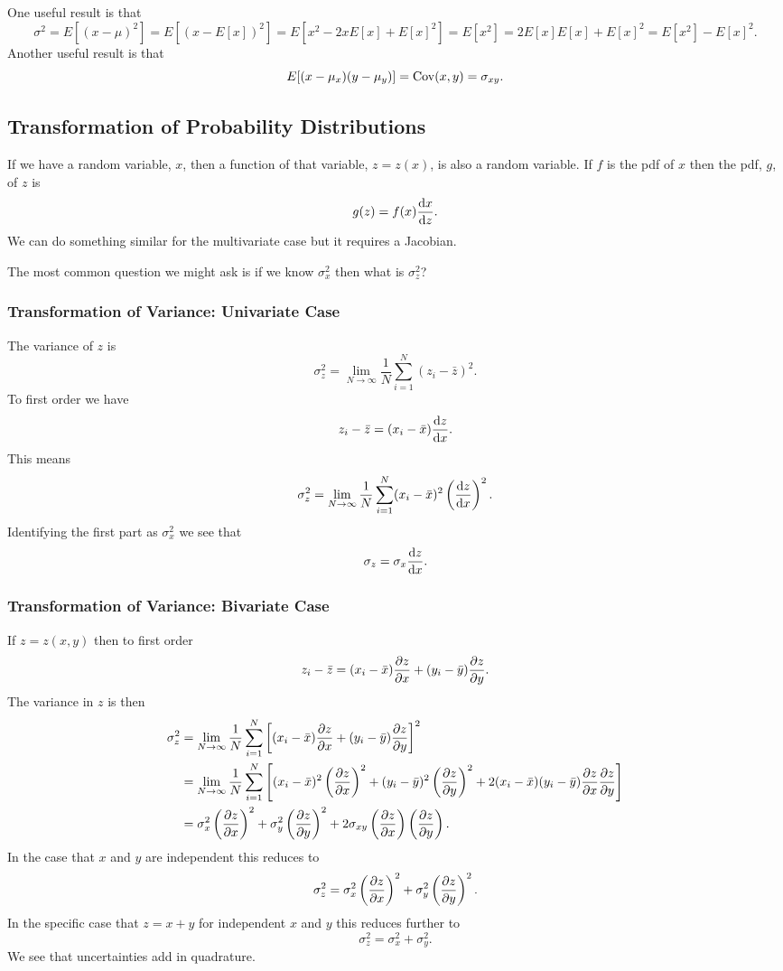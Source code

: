     One useful result is that
    \[\sigma^2 = E[(x - \mu)^2] = E[(x - E[x])^2] = E[x^2 - 2xE[x] + E[x]^2] = E[x^2] = 2E[x]E[x] + E[x]^2 = E[x^2] - E[x]^2.\]
    Another useful result is that
    \[E[(x - \mu_x)(y - \mu_y)] = \operatorname{Cov}(x, y) = \sigma_{xy}.\]
    
    \subsection{Transformation of Probability Distributions}
    If we have a random variable, \(x\), then a function of that variable, \(z = z(x)\), is also a random variable.
    If \(f\) is the \acrshort{pdf} of \(x\) then the \acrshort{pdf}, \(g\), of \(z\) is
    \[g(z) = f(x)\dv{x}{z}.\]
    We can do something similar for the multivariate case but it requires a Jacobian.
    
    The most common question we might ask is if we know \(\sigma_x^2\) then what is \(\sigma_z^2\)?
    
    \subsubsection{Transformation of Variance: Univariate Case}
    The variance of \(z\) is
    \[\sigma_z^2 = \lim_{N\to\infty}\frac{1}{N}\sum_{i=1}^{N} (z_i - \bar{z})^2.\]
    To first order we have
    \[z_i - \bar{z} = (x_i - \bar{x})\dv{z}{x}.\]
    This means
    \[\sigma_z^2 = \lim_{N\to\infty}\frac{1}{N}\sum_{i=1}^{N} (x_i - \bar{x})^2\left(\dv{z}{x}\right)^2.\]
    Identifying the first part as \(\sigma_x^2\) we see that
    \[\sigma_z = \sigma_x\dv{z}{x}.\]
    
    \subsubsection{Transformation of Variance: Bivariate Case}
    If \(z = z(x, y)\) then to first order
    \[z_i - \bar{z} = (x_i - \bar{x})\pdv{z}{x} + (y_i - \bar{y})\pdv{z}{y}.\]
    The variance in \(z\) is then
    \begin{align*}
        \sigma_z^2 &= \lim_{N\to\infty}\frac{1}{N}\sum_{i=1}^{N} \left[(x_i - \bar{x})\pdv{z}{x} + (y_i - \bar{y})\pdv{z}{y}\right]^2\\
        &= \lim_{N\to\infty}\frac{1}{N}\sum_{i=1}^{N} \left[(x_i - \bar{x})^2\left(\pdv{z}{x}\right)^2 + (y_i - \bar{y})^2\left(\pdv{z}{y}\right)^2 + 2(x_i - \bar{x})(y_i - \bar{y})\pdv{z}{x}\pdv{z}{y}\right]\\
        &= \sigma_x^2\left(\pdv{z}{x}\right)^2 + \sigma_y^2\left(\pdv{z}{y}\right)^2 + 2\sigma_{xy}\left(\pdv{z}{x}\right)\left(\pdv{z}{y}\right).
    \end{align*}
    In the case that \(x\) and \(y\) are independent this reduces to
    \[\sigma_z^2 = \sigma_x^2\left(\pdv{z}{x}\right)^2 + \sigma_y^2\left(\pdv{z}{y}\right)^2.\]
    In the specific case that \(z = x + y\) for independent \(x\) and \(y\) this reduces further to
    \[\sigma_z^2 = \sigma_x^2 + \sigma_y^2.\]
    We see that uncertainties add in quadrature.
    
